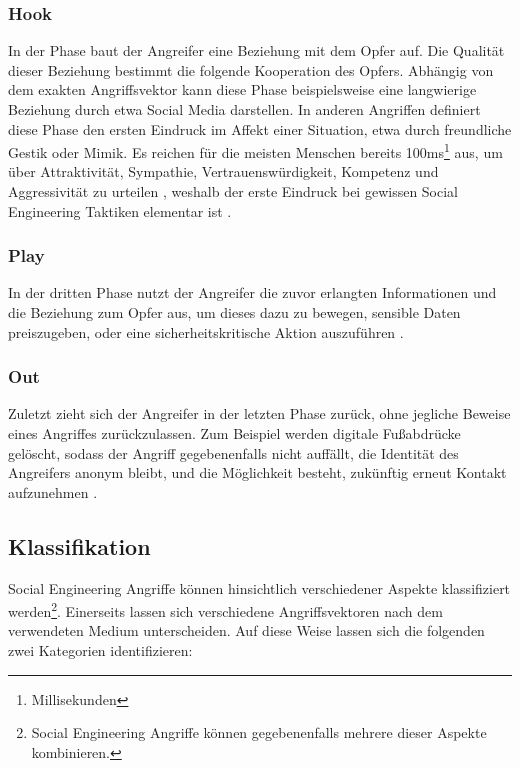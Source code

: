 \subsubsection{Hook}
In der  Phase baut der Angreifer eine Beziehung mit dem Opfer auf. Die Qualität dieser Beziehung bestimmt
die folgende Kooperation des Opfers. Abhängig von dem exakten Angriffsvektor kann diese Phase beispielsweise
eine langwierige Beziehung durch etwa Social Media darstellen. In anderen Angriffen definiert diese Phase den ersten
Eindruck im Affekt einer Situation, etwa durch freundliche Gestik oder Mimik. Es reichen für die meisten Menschen
bereits 100ms\footnote{Millisekunden} aus, um über Attraktivität, Sympathie, Vertrauenswürdigkeit, Kompetenz und
Aggressivität zu urteilen , weshalb der erste Eindruck bei gewissen Social Engineering
Taktiken elementar ist .

\subsubsection{Play}
In der dritten Phase nutzt der Angreifer die zuvor erlangten Informationen und die Beziehung zum Opfer aus,
um dieses dazu zu bewegen, sensible Daten preiszugeben, oder eine sicherheitskritische Aktion auszuführen .

\subsubsection{Out}
Zuletzt zieht sich der Angreifer in der letzten Phase zurück, ohne jegliche Beweise eines Angriffes zurückzulassen.
Zum Beispiel werden digitale Fußabdrücke gelöscht, sodass der Angriff gegebenenfalls nicht auffällt,
die Identität des Angreifers anonym bleibt, und die Möglichkeit besteht, zukünftig erneut Kontakt aufzunehmen .

\subsection{Klassifikation}

Social Engineering Angriffe können hinsichtlich verschiedener Aspekte klassifiziert werden\footnote{Social Engineering Angriffe können gegebenenfalls mehrere dieser Aspekte kombinieren.}.
Einerseits lassen sich verschiedene Angriffsvektoren nach dem verwendeten Medium unterscheiden.
Auf diese Weise lassen sich die folgenden zwei Kategorien identifizieren:

